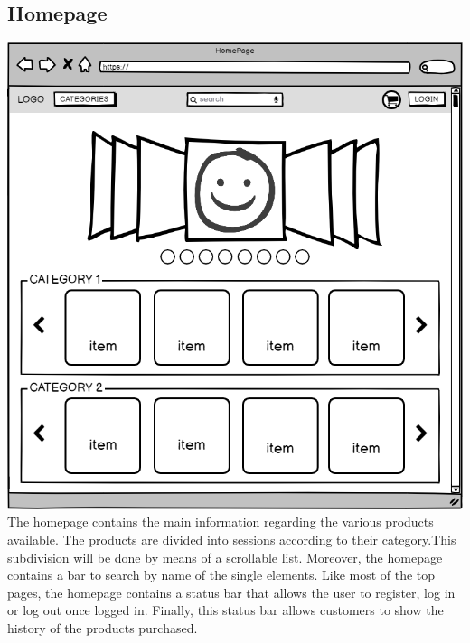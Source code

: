 \subsection{Homepage}
    \includegraphics[width=\textwidth,height=\textheight,keepaspectratio]{mockups/homepageMockup.png}
\\
The homepage contains the main information regarding the various products available.
The products are divided into sessions according to their category.This subdivision will be done by means of a scrollable list. Moreover, the homepage contains a bar to search by name of the single elements.
Like most of the top pages, the homepage contains a status bar that allows the user to register, log in or log out once logged in.
Finally, this status bar allows customers to show the history of the products purchased.


